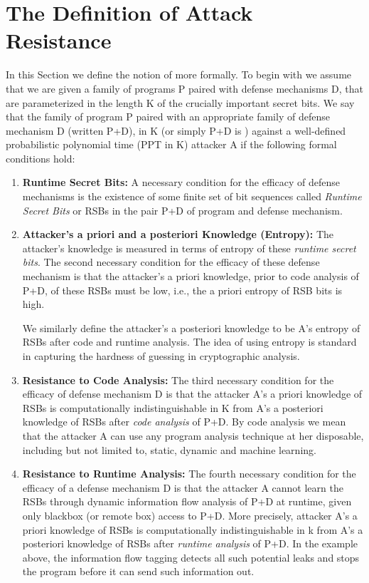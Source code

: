 \section{The Definition of Attack Resistance}

In this Section we define the notion of \resistance more formally. To
begin with we assume that we are given a family of programs P paired
with defense mechanisms D, that are parameterized in the length K of
the crucially important secret bits.  We say that the family of
program P paired with an appropriate family of defense mechanism D
(written P+D), \resistant in K (or simply P+D is \resistant) against a
well-defined probabilistic polynomial time (PPT in K) attacker A if
the following formal conditions hold:

\begin{enumerate}

\item {\bf Runtime Secret Bits:} A necessary condition for the
  efficacy of defense mechanisms is the existence of some finite set
  of bit sequences called {\it Runtime Secret Bits} or RSBs in the
  pair P+D of program and defense mechanism.

\item {\bf Attacker's a priori and a posteriori Knowledge (Entropy):}
  The attacker's knowledge is measured in terms of entropy of these
  {\it runtime secret bits}. The second necessary condition for the
  efficacy of these defense mechanism is that the attacker's a priori
  knowledge, prior to code analysis of P+D, of these RSBs must be low,
  i.e., the a priori entropy of RSB bits is high.

  We similarly define the attacker's a posteriori knowledge to be A's
  entropy of RSBs after code and runtime analysis. The idea of using
  entropy is standard in capturing the hardness of guessing in
  cryptographic analysis.

\item {\bf Resistance to Code Analysis:} The third necessary condition
  for the efficacy of defense mechanism D is that the attacker A's a
  priori knowledge of RSBs is computationally indistinguishable in K
  from A's a posteriori knowledge of RSBs after {\it code analysis} of
  P+D. By code analysis we mean that the attacker A can use any
  program analysis technique at her disposable, including but not
  limited to, static, dynamic and machine learning.
 
\item {\bf Resistance to Runtime Analysis:} The fourth necessary
  condition for the efficacy of a defense mechanism D is that the
  attacker A cannot learn the RSBs through dynamic information flow
  analysis of P+D at runtime, given only blackbox (or remote box)
  access to P+D. More precisely, attacker A's a priori knowledge of
  RSBs is computationally indistinguishable in k from A's a posteriori
  knowledge of RSBs after {\it runtime analysis} of P+D. In the
  example above, the information flow tagging detects all such
  potential leaks and stops the program before it can send such
  information out.


\end{enumerate}
